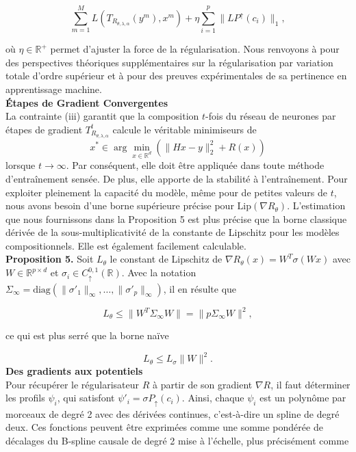 \documentclass[a4paper, 12pt]{report} %
\begin{document}
\[
\sum_{m=1}^{M} L \left( T_{R_{\theta, \lambda, \alpha}}(y^m), x^m \right) + \eta \sum_{i=1}^{p} \| L P^{\uparrow}(c_i) \|_1, 
\]

où \( \eta \in \mathbb{R}^+ \) permet d'ajuster la force de la régularisation. Nous renvoyons à \cite{unser2019representer} pour des perspectives théoriques supplémentaires sur la régularisation par variation totale d'ordre supérieur et à \cite{bohra2020learning} pour des preuves expérimentales de sa pertinence en apprentissage machine.\\
\textbf{Étapes de Gradient Convergentes}\\
La contrainte (iii) garantit que la composition \( t \)-fois du réseau de neurones par étapes de gradient \( T_{R_{\theta, \lambda, \alpha}}^t \) calcule le véritable minimiseurs de \[
x^* \in \arg \min_{x \in \mathbb{R}^d} \left( \| Hx - y \|_2^2 + R(x) \right)
\] lorsque \( t \to \infty \). Par conséquent, elle doit être appliquée dans toute méthode d'entraînement sensée. De plus, elle apporte de la stabilité à l'entraînement. Pour exploiter pleinement la capacité du modèle, même pour de petites valeurs de \( t \), nous avons besoin d'une borne supérieure précise pour \( \text{Lip}(\nabla R_\theta) \). L'estimation que nous fournissons dans la Proposition 5 est plus précise que la borne classique dérivée de la sous-multiplicativité de la constante de Lipschitz pour les modèles compositionnels. Elle est également facilement calculable.\\
\textbf{Proposition 5.}
Soit \( L_\theta \) le constant de Lipschitz de \( \nabla R_\theta(x) = W^T \sigma(Wx) \) avec \( W \in \mathbb{R}^{p \times d} \) et \( \sigma_i \in C^{0,1}_{\uparrow}(\mathbb{R}) \). Avec la notation \( \Sigma_\infty = \text{diag}(\|\sigma'_1\|_\infty, \ldots, \|\sigma'_p\|_\infty) \), il en résulte que

\[
L_\theta \leq \|W^T \Sigma_\infty W\| = \|p \Sigma_\infty W\|^2, 
\]

ce qui est plus serré que la borne naïve

\[
L_\theta \leq L_\sigma \|W\|^2.
\]
\textbf{Des gradients aux potentiels}\\
Pour récupérer le régularisateur \( R \) à partir de son gradient \( \nabla R \), il faut déterminer les profils \( \psi_i \), qui satisfont \( \psi'_i = \sigma P_{\uparrow}(c_i) \). Ainsi, chaque \( \psi_i \) est un polynôme par morceaux de degré 2 avec des dérivées continues, c'est-à-dire un spline de degré deux. Ces fonctions peuvent être exprimées comme une somme pondérée de décalages du B-spline causale de degré 2 mise à l'échelle, plus précisément comme
\end{document}
